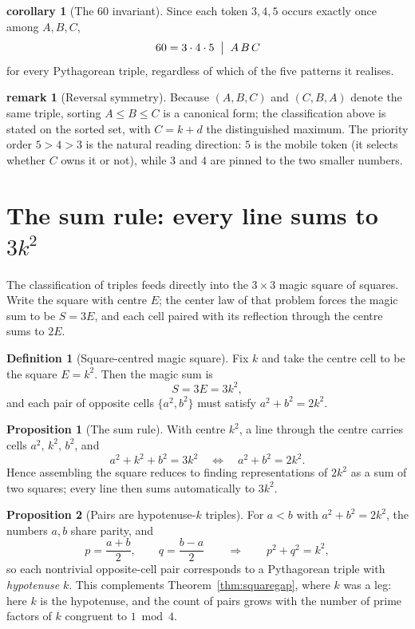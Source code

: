\documentclass[11pt]{article}
\theoremstyle{definition}
\newtheorem{definition}{Definition}
\newtheorem{proposition}{Proposition}
\newtheorem{remark}{remark}
\newtheorem{corollary}{corollary}
\begin{document}
\begin{corollary}[The $60$ invariant]\label{cor:sixty}
Since each token $3,4,5$ occurs exactly once among $A,B,C$,
\[
  60 = 3\cdot4\cdot5 \;\bigm|\; A\,B\,C
\]
for every Pythagorean triple, regardless of which of the five patterns it
realises.
\end{corollary}

\begin{remark}[Reversal symmetry]
Because $(A,B,C)$ and $(C,B,A)$ denote the same triple, sorting $A\le B\le C$ is a
canonical form; the classification above is stated on the sorted set, with
$C=k+d$ the distinguished maximum. The priority order $5>4>3$ is the natural
reading direction: $5$ is the mobile token (it selects whether $C$ owns it or
not), while $3$ and $4$ are pinned to the two smaller numbers.
\end{remark}

\section{The sum rule: every line sums to $3k^{2}$}

The classification of triples feeds directly into the $3\times3$ magic square of
squares. Write the square with centre $E$; the center law of that problem forces
the magic sum to be $S=3E$, and each cell paired with its reflection through the
centre sums to $2E$.

\begin{definition}[Square-centred magic square]
Fix $k$ and take the centre cell to be the square $E=k^{2}$. Then the magic sum is
\[
  S = 3E = 3k^{2},
\]
and each pair of opposite cells $\{a^{2},b^{2}\}$ must satisfy $a^{2}+b^{2}=2k^{2}$.
\end{definition}

\begin{proposition}[The sum rule]\label{prop:sumrule}
With centre $k^{2}$, a line through the centre carries cells $a^{2},\,k^{2},\,b^{2}$,
and
\[
  a^{2}+k^{2}+b^{2}=3k^{2}
  \quad\Longleftrightarrow\quad
  a^{2}+b^{2}=2k^{2}.
\]
Hence assembling the square reduces to finding representations of $2k^{2}$ as a
sum of two squares; every line then sums automatically to $3k^{2}$.
\end{proposition}

\begin{proposition}[Pairs are hypotenuse-$k$ triples]\label{prop:pairtriple}
For $a<b$ with $a^{2}+b^{2}=2k^{2}$, the numbers $a,b$ share parity, and
\[
  p=\frac{a+b}{2},\qquad q=\frac{b-a}{2}
  \qquad\Longrightarrow\qquad
  p^{2}+q^{2}=k^{2},
\]
so each nontrivial opposite-cell pair corresponds to a Pythagorean triple with
\emph{hypotenuse} $k$. This complements Theorem~\ref{thm:squaregap}, where $k$ was a
leg: here $k$ is the hypotenuse, and the count of pairs grows with the number of
prime factors of $k$ congruent to $1\bmod 4$.
\end{proposition}
\end{document}
